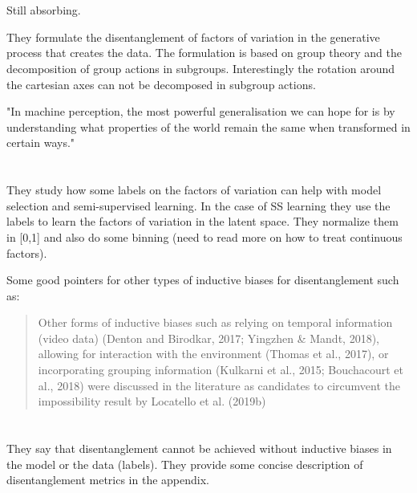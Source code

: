 \documentclass{article}
\newcommand{\citeall}[1]{\citeauthor{#1}}
\begin{document}
\section{\citeall{Higgins2018TowardsRepresentations}}

Still absorbing.

They formulate the disentanglement of factors of variation in the generative process that creates the data. The formulation is based on group theory and the decomposition of group actions in subgroups. Interestingly the rotation around the cartesian axes can not be decomposed in subgroup actions. 

"In machine perception, the most powerful generalisation we can hope for is by understanding what properties of the world remain the same when transformed in certain ways."

\section{\citeall{Locatello2019DisentanglingLabels}}

They study how some labels on the factors of variation can help with model selection and semi-supervised learning. In the case of SS learning they use the labels to learn the factors of variation in the latent space. They normalize them in [0,1] and also do some binning (need to read more on how to treat continuous factors).

Some good pointers for other types of inductive biases for disentanglement such as:

\begin{quote}
Other forms of inductive biases such as relying on temporal information (video data) (Denton and Birodkar, 2017; Yingzhen & Mandt, 2018), allowing for interaction with the environment (Thomas et al., 2017), or incorporating grouping information (Kulkarni et al., 2015; Bouchacourt et al., 2018) were discussed in the literature as candidates to circumvent the impossibility result by Locatello et al. (2019b)
\end{quote}


\section{\citeall{Locatello2018ChallengingRepresentations}}

They say that disentanglement cannot be achieved without inductive biases in the model or the data (labels). They provide some concise description of disentanglement metrics in the appendix.
\end{document}
